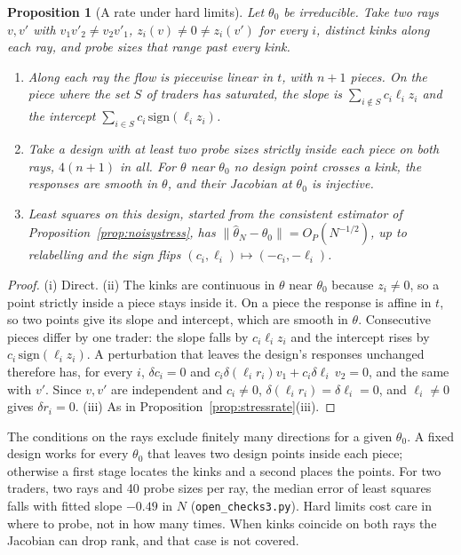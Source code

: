 \documentclass[12pt]{article}
\newtheorem{proposition}[theorem]{Proposition}
\theoremstyle{definition}
\theoremstyle{remark}
\begin{document}
\begin{proposition}[A rate under hard limits]\label{prop:hardrate}
Let $\theta_0$ be irreducible. Take two rays $v,v'$ with $v_1v'_2\ne v_2v'_1$, $z_i(v)\ne0\ne z_i(v')$ for every $i$, distinct kinks along each ray, and probe sizes that range past every kink.
\begin{enumerate}[label=(\roman*),itemsep=1pt]
\item Along each ray the flow is piecewise linear in $t$, with $n+1$ pieces. On the piece where the set $S$ of traders has saturated, the slope is $\sum_{i\notin S}c_i\ell_iz_i$ and the intercept $\sum_{i\in S}c_i\,\mathrm{sign}(\ell_iz_i)$.
\item Take a design with at least two probe sizes strictly inside each piece on both rays, $4(n+1)$ in all. For $\theta$ near $\theta_0$ no design point crosses a kink, the responses are smooth in $\theta$, and their Jacobian at $\theta_0$ is injective.
\item Least squares on this design, started from the consistent estimator of Proposition~\ref{prop:noisystress}, has $\|\hat\theta_N-\theta_0\|=O_P(N^{-1/2})$, up to relabelling and the sign flips $(c_i,\ell_i)\mapsto(-c_i,-\ell_i)$.
\end{enumerate}
\end{proposition}

\begin{proof}
(i) Direct. (ii) The kinks are continuous in $\theta$ near $\theta_0$ because $z_i\ne0$, so a point strictly inside a piece stays inside it. On a piece the response is affine in $t$, so two points give its slope and intercept, which are smooth in $\theta$. Consecutive pieces differ by one trader: the slope falls by $c_i\ell_iz_i$ and the intercept rises by $c_i\,\mathrm{sign}(\ell_iz_i)$. A perturbation that leaves the design's responses unchanged therefore has, for every $i$, $\delta c_i=0$ and $c_i\delta(\ell_ir_i)v_1+c_i\delta\ell_i\,v_2=0$, and the same with $v'$. Since $v,v'$ are independent and $c_i\ne0$, $\delta(\ell_ir_i)=\delta\ell_i=0$, and $\ell_i\ne0$ gives $\delta r_i=0$. (iii) As in Proposition~\ref{prop:stressrate}(iii).
\end{proof}

The conditions on the rays exclude finitely many directions for a given $\theta_0$. A fixed design works for every $\theta_0$ that leaves two design points inside each piece; otherwise a first stage locates the kinks and a second places the points. For two traders, two rays and 40 probe sizes per ray, the median error of least squares falls with fitted slope $-0.49$ in $N$ (\nolinkurl{open_checks3.py}). Hard limits cost care in where to probe, not in how many times. When kinks coincide on both rays the Jacobian can drop rank, and that case is not covered.
\end{document}
